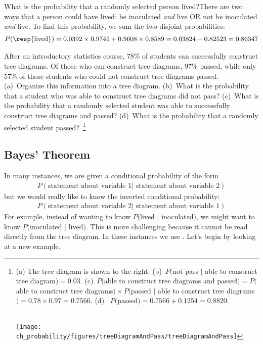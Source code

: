 \begin{example}{What is the probability that a randomly selected person lived?}There are two ways that a person could have lived:  be inoculated \emph{and} live OR not be inoculated \emph{and} live. To find this probability, we sum the two disjoint probabilities:
\begin{align*}
P(\text{\resp{lived}}) = 0.0392 \times 0.9745 + 0.9608 \times 0.8589 = 0.03824 + 0.82523 = 0.86347
\end{align*}
\end{example}

\begin{exercise}
After an introductory statistics course, 78\% of students can successfully construct tree diagrams. Of those who can construct tree diagrams, 97\% passed, while only 57\% of those students who could not construct tree diagrams passed. (a)~Organize this information into a tree diagram. {(b)~What is the probability that a student who was able to construct tree diagrams did not pass? (c)~What is the probability that a randomly selected student was able to successfully construct tree diagrams and passed? (d)~What is the probability that a randomly selected student passed?}\
\footnote{\begin{minipage}[t]{0.47\linewidth}
(a) The tree diagram is shown to the right.
(b)~$P($not pass $|$ able to construct tree diagram$) = 0.03$.
(c)~$P($able to construct tree diagrams and passed$) = P($able to construct tree diagrams$) \times P($passed $|$ able to construct tree diagrams$) = 0.78 \times 0.97 = 0.7566$.
(d)~ $P($passed$) = 0.7566 + 0.1254 = 0.8820$. \vspace{15mm} \\\
\end{minipage}
\begin{minipage}[c]{0.5\linewidth}
\texttt{[image: ch\_probability/figures/treeDiagramAndPass/treeDiagramAndPass]} \vspace{-25mm}
\end{minipage}}
\end{exercise}


\subsection{Bayes' Theorem}
\label{bayesTheoremSubsection}


In many instances, we are given a conditional probability of the form
\begin{align*}
P(\text{statement about variable 1} | \text{ statement about variable 2})
\end{align*}
but we would really like to know the inverted conditional probability:
\begin{align*}
P(\text{statement about variable 2} | \text{ statement about variable 1})
\end{align*}
For example, instead of wanting to know $P($lived $|$ inoculated$)$, we might want to know $P($inoculated $|$ lived$)$. This is more challenging because it cannot be read directly from the tree diagram. In these instances we use . Let's begin by looking at a new example.


